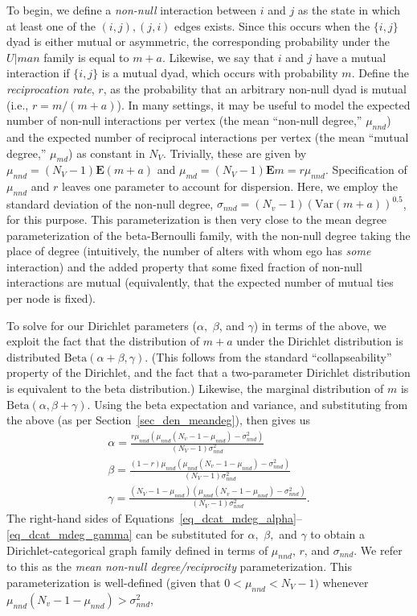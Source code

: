 \documentclass[11pt]{article}
\begin{document}
To begin, we define a \emph{non-null} interaction between $i$ and $j$ as the state in which at least one of the $(i,j),(j,i)$ edges exists.  Since this occurs when the $\{i,j\}$ dyad is either mutual or asymmetric, the corresponding probability under the $U|man$ family is equal to $m+a$.  Likewise, we say that $i$ and $j$ have a mutual interaction if $\{i,j\}$ is a mutual dyad, which occurs with probability $m$.  Define the \emph{reciprocation rate}, $r$, as the probability that an arbitrary non-null dyad is mutual (i.e., $r=m/(m+a)$).  In many settings, it may be useful to model the expected number of non-null interactions per vertex (the mean ``non-null degree,'' $\mu_{nnd}$) and the expected number of reciprocal interactions per vertex (the mean ``mutual degree,'' $\mu_{md}$) as constant in $N_V$.  Trivially, these are given by $\mu_{nnd}=(N_V-1)\mathbf{E}(m+a)$ and $\mu_{md}=(N_V-1)\mathbf{E}m=r \mu_{nnd}$.  Specification of $\mu_{nnd}$ and $r$ leaves one parameter to account for dispersion.  Here, we employ the standard deviation of the non-null degree, $\sigma_{nnd}=(N_v-1)(\mathrm{Var} (m+a))^{0.5}$, for this purpose.  This parameterization is then very close to the mean degree parameterization of the beta-Bernoulli family, with the non-null degree taking the place of degree (intuitively, the number of alters with whom ego has \emph{some} interaction) and the added property that some fixed fraction of non-null interactions are mutual (equivalently, that the expected number of mutual ties per node is fixed).

To solve for our Dirichlet parameters ($\alpha,$ $\beta$, and $\gamma$) in terms of the above, we exploit the fact that the distribution of $m+a$ under the Dirichlet distribution is distributed $\mathrm{Beta}(\alpha+\beta,\gamma)$.  (This follows from the standard ``collapseability'' property of the Dirichlet, and the fact that a two-parameter Dirichlet distribution is equivalent to the beta distribution.)  Likewise, the marginal distribution of $m$ is $\mathrm{Beta}(\alpha,\beta+\gamma)$.  Using the beta expectation and variance, and substituting from the above (as per Section~\ref{sec_den_meandeg}), then gives us
\begin{gather}
\alpha = \frac{r \mu_{nnd} \left(\mu_{nnd}\left(N_v-1-\mu_{nnd}\right)-\sigma_{nnd}^2\right)}{(N_V-1)\sigma_{nnd}^2} \label{eq_dcat_mdeg_alpha}\\
\beta = \frac{(1-r) \mu_{nnd} \left(\mu_{nnd}\left(N_v-1-\mu_{nnd}\right)-\sigma_{nnd}^2\right)}{(N_V-1)\sigma_{nnd}^2} \label{eq_dcat_mdeg_beta}\\
\gamma = \frac{\left(N_V-1-\mu_{nnd}\right) \left(\mu_{nnd}\left(N_v-1-\mu_{nnd}\right)-\sigma_{nnd}^2\right)}{(N_V-1)\sigma_{nnd}^2}. \label{eq_dcat_mdeg_gamma}
\end{gather} 
\noindent
The right-hand sides of Equations~\ref{eq_dcat_mdeg_alpha}--\ref{eq_dcat_mdeg_gamma} can be substituted for $\alpha,$ $\beta,$ and $\gamma$ to obtain a Dirichlet-categorical graph family defined in terms of $\mu_{nnd}$, $r$, and $\sigma_{nnd}$.  We refer to this as the \emph{mean non-null degree/reciprocity} parameterization.  This parameterization is well-defined (given that $0<\mu_{nnd}<N_V-1)$ whenever $\mu_{nnd}(N_v-1-\mu_{nnd})>\sigma_{nnd}^2$, 
\end{document}
